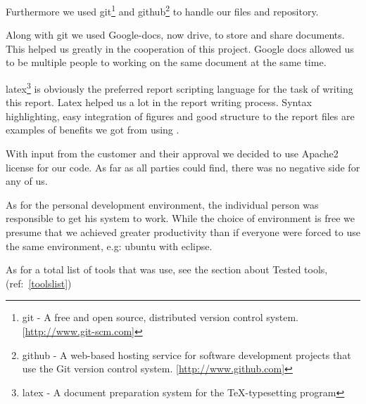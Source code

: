     Furthermore we used \gls{git}\footnote{\gls{git} - A free and open source, distributed version control system. [\url{http://www.git-scm.com}]} and \gls{github}\footnote{\gls{github} - A web-based hosting service for software development projects that use the Git version control system. [\url{http://www.github.com}]} to handle our files and repository. 
    
    Along with git we used Google-docs, now drive, to store and share documents. This helped us greatly in the cooperation of this project. Google docs allowed us to be multiple people to working on the same document at the same time. 
    
    \gls{latex}\footnote{\gls{latex} - A document preparation system for the \TeX -typesetting program} is obviously the preferred report scripting language for the task of writing this report. Latex helped us a lot in the report writing process. Syntax highlighting, easy integration of figures and good structure to the report files are examples of benefits we got from using \Tex.
    
    With input from the customer and their approval we decided to use Apache2 license for our code. As far as all parties could find, there was no negative side for any of us. 

    As for the personal development environment, the individual person was responsible to get his system to work. While the choice of environment is free we presume that we achieved greater productivity than if everyone were forced to use the same environment, e.g: ubuntu with eclipse.  

    As for a total list of tools that was use, see the section about Tested tools, (ref:~\ref{toolslist})    
    
